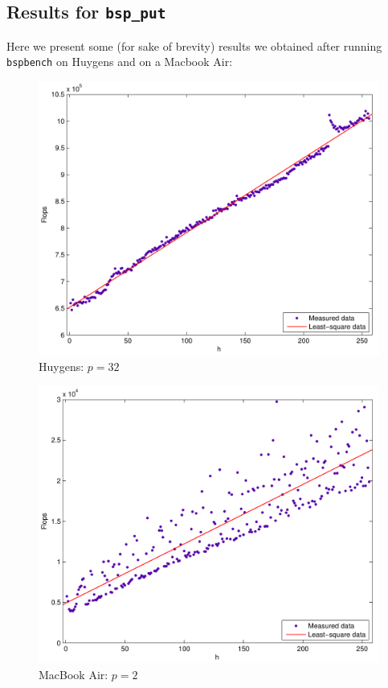 \documentclass[a4paper,11pt]{article}
\begin{document}
\subsection*{Results for \texttt{bsp\_put}}
Here we present some  (for sake of brevity) results we obtained after running \texttt{bspbench} on Huygens and on a Macbook Air:

\begin{figure}[H]
\begin{center}
\includegraphics[scale=0.6]{img/32-put}
\end{center}
\caption{Huygens: $p=32$}\label{huy:32}
\end{figure}

\begin{figure}[H]
\begin{center}
\includegraphics[scale=0.6]{img/mb-2-put}
\end{center}
\caption{MacBook Air: $p=2$}\label{mb:2}
\end{figure}
\end{document}
